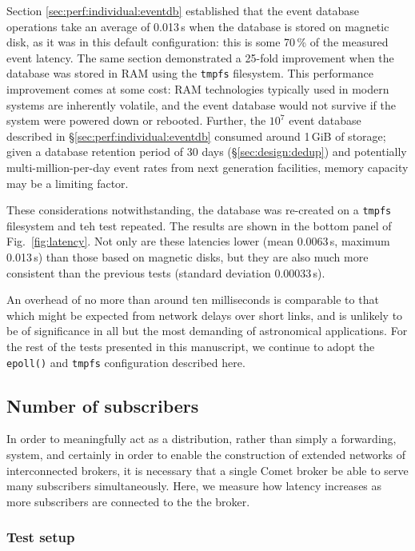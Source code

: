 \documentclass[5p,authoryear]{elsarticle}
\begin{document}
Section \ref{sec:perf:individual:eventdb} established that the event database
operations take an average of 0.013\,s when the database is stored on magnetic
disk, as it was in this default configuration: this is some 70\,\% of the
measured event latency. The same section demonstrated a 25-fold improvement
when the database was stored in RAM using the \texttt{tmpfs} filesystem. This
performance improvement comes at some cost: RAM technologies typically used in
modern systems are inherently volatile, and the event database would not
survive if the system were powered down or rebooted. Further, the $10^7$ event
database described in \S\ref{sec:perf:individual:eventdb} consumed around
1\,GiB of storage; given a database retention period of 30 days
(\S\ref{sec:design:dedup}) and potentially multi-million-per-day event rates
from next generation facilities, memory capacity may be a limiting factor.

These considerations notwithstanding, the database was re-created on a
\texttt{tmpfs} filesystem and teh test repeated. The results are shown in the
bottom panel of Fig.~\ref{fig:latency}. Not only are these latencies lower
(mean 0.0063\,s, maximum 0.013\,s) than those based on magnetic disks, but
they are also much more consistent than the previous tests (standard deviation
0.00033\,s).

An overhead of no more than around ten milliseconds is comparable to that
which might be expected from network delays over short links, and is unlikely
to be of significance in all but the most demanding of astronomical
applications. For the rest of the tests presented in this manuscript, we
continue to adopt the \texttt{epoll()} and \texttt{tmpfs} configuration
described here.

\subsection{Number of subscribers}

In order to meaningfully act as a distribution, rather than simply a
forwarding, system, and certainly in order to enable the construction of
extended networks of interconnected brokers, it is necessary that a single
Comet broker be able to serve many subscribers simultaneously. Here, we
measure how latency increases as more subscribers are connected to the the
broker.

\subsubsection{Test setup}
\end{document}
